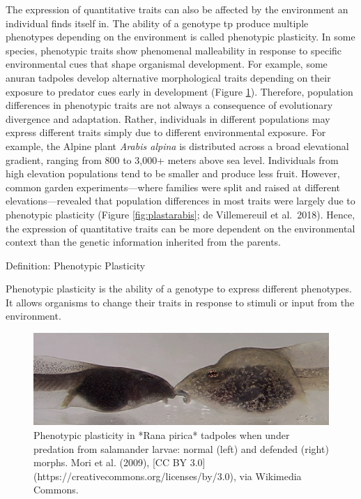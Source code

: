 \documentclass[
]{book}
\begin{document}
The expression of quantitative traits can also be affected by the environment an individual finds itself in. The ability of a genotype tp produce multiple phenotypes depending on the environment is called phenotypic plasticity. In some species, phenotypic traits show phenomenal malleability in response to specific environmental cues that shape organismal development. For example, some anuran tadpoles develop alternative morphological traits depending on their exposure to predator cues early in development (Figure \ref{fig:rana}). Therefore, population differences in phenotypic traits are not always a consequence of evolutionary divergence and adaptation. Rather, individuals in different populations may express different traits simply due to different environmental exposure. For example, the Alpine plant \emph{Arabis alpina} is distributed across a broad elevational gradient, ranging from 800 to 3,000+ meters above sea level. Individuals from high elevation populations tend to be smaller and produce less fruit. However, common garden experiments---where families were split and raised at different elevations---revealed that population differences in most traits were largely due to phenotypic plasticity (Figure \ref{fig:plastarabis}; de Villemereuil et al.~2018). Hence, the expression of quantitative traits can be more dependent on the environmental context than the genetic information inherited from the parents.

Definition: Phenotypic Plasticity

Phenotypic plasticity is the ability of a genotype to express different phenotypes. It allows organisms to change their traits in response to stimuli or input from the environment.

\begin{figure}
\includegraphics[width=1\linewidth]{images/rana} \caption{Phenotypic plasticity in *Rana pirica* tadpoles when under predation from salamander larvae: normal (left) and defended (right) morphs. Mori et al. (2009), [CC BY 3.0](https://creativecommons.org/licenses/by/3.0), via Wikimedia Commons.}\label{fig:rana}
\end{figure}
\end{document}

